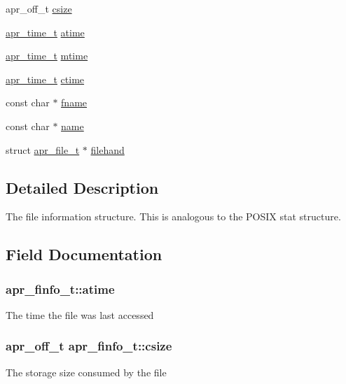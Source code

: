 \begin{DoxyCompactItemize}
apr\+\_\+off\+\_\+t \hyperlink{structapr__finfo__t_aeaa4a4def98ad4f162e05c2e2292321d}{csize}
\item 
\hyperlink{group__apr__time_gadb4bde16055748190eae190c55aa02bb}{apr\+\_\+time\+\_\+t} \hyperlink{structapr__finfo__t_ad78874e5751e9bba30debb0826eb96a7}{atime}
\item 
\hyperlink{group__apr__time_gadb4bde16055748190eae190c55aa02bb}{apr\+\_\+time\+\_\+t} \hyperlink{structapr__finfo__t_afc3bec0f6b3b10160428ba5602a41c60}{mtime}
\item 
\hyperlink{group__apr__time_gadb4bde16055748190eae190c55aa02bb}{apr\+\_\+time\+\_\+t} \hyperlink{structapr__finfo__t_aebbdb3dc755d825de3dce901cfba0883}{ctime}
\item 
const char $\ast$ \hyperlink{structapr__finfo__t_acfed83ab2943ee7a58a215aa1cfd9e47}{fname}
\item 
const char $\ast$ \hyperlink{structapr__finfo__t_a2915f9141ea76ae3672ccf9eb0fa77bb}{name}
\item 
struct \hyperlink{group__apr__file__io_gaa46e4763ac375ea3c7a43ba6f6099e22}{apr\+\_\+file\+\_\+t} $\ast$ \hyperlink{structapr__finfo__t_a7858e3d9c5f6ed062d9ff7f5c79b6336}{filehand}
\end{DoxyCompactItemize}


\subsection{Detailed Description}
The file information structure. This is analogous to the P\+O\+S\+IX stat structure. 

\subsection{Field Documentation}
\subsubsection[{\texorpdfstring{atime}{atime}}]{ apr\+\_\+finfo\+\_\+t\+::atime}\hypertarget{structapr__finfo__t_ad78874e5751e9bba30debb0826eb96a7}{}\label{structapr__finfo__t_ad78874e5751e9bba30debb0826eb96a7}
The time the file was last accessed 
\subsubsection[{\texorpdfstring{csize}{csize}}]{\setlength{\rightskip}{0pt plus 5cm}apr\+\_\+off\+\_\+t apr\+\_\+finfo\+\_\+t\+::csize}\hypertarget{structapr__finfo__t_aeaa4a4def98ad4f162e05c2e2292321d}{}\label{structapr__finfo__t_aeaa4a4def98ad4f162e05c2e2292321d}
The storage size consumed by the file 
